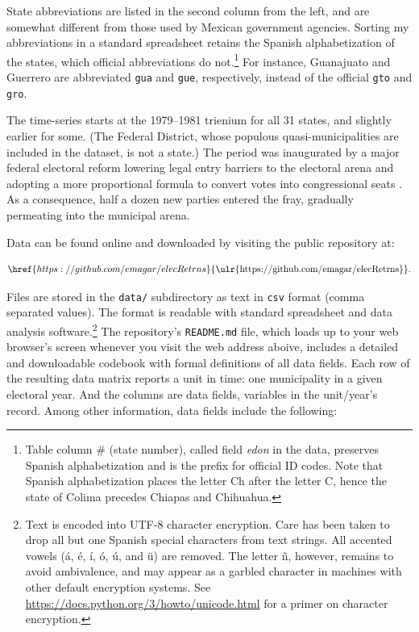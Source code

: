 \documentclass[letter,12pt]{article}
\begin{document}
State abbreviations are listed in the second column from the left, and are somewhat different from those used by Mexican government agencies. Sorting my abbreviations in a standard spreadsheet retains the Spanish alphabetization of the states, which official abbreviations do not.\footnote{Table column \# (state number), called field \emph{edon} in the data, preserves Spanish alphabetization and is the prefix for official ID codes. Note that Spanish alphabetization places the letter Ch after the letter C, hence the state of Colima precedes Chiapas and Chihuahua.} For instance, Guanajuato and Guerrero are abbreviated \verb|gua| and \verb|gue|, respectively, instead of the official \verb|gto| and \verb|gro|.

The time-series starts at the 1979--1981 trienium for all 31 states, and slightly earlier for some. (The Federal District, whose populous quasi-municipalities are included in the dataset, is not a state.) The period was inaugurated by a major federal electoral reform lowering legal entry barriers to the electoral arena and adopting a more proportional formula to convert votes into congressional seats \citep[:116]{molinar.1991a}. As a consequence, half a dozen new parties entered the fray, gradually permeating into the municipal arena.  

Data can be found online and downloaded by visiting the public repository at:

\begin{equation*}
\href{https://github.com/emagar/elecRetrns}{\text{\ulr{https://github.com/emagar/elecRetrns}}}.
\end{equation*}

\noindent Files are stored in the \verb|data/| subdirectory as text in \verb|csv| format (comma separated values). The format is readable with standard spreadsheet and data analysis software.\footnote{Text is encoded into UTF-8 character encryption. Care has been taken to drop all but one Spanish special characters from text strings. All accented vowels (\'a, \'e, \'i, \'o, \'u, and \"u) are removed. The letter \~n, however, remains to avoid ambivalence, and may appear as a garbled character in machines with other default encryption systems. See \url{https://docs.python.org/3/howto/unicode.html} for a primer on character encryption.} The repository's \verb|README.md| file, which loads up to your web browser's screen whenever you visit the web address aboive, includes a detailed and downloadable codebook with formal definitions of all data fields. Each row of the resulting data matrix reports a unit in time: one municipality in a given electoral year. And the columns are data fields, variables in the unit/year's record. Among other information, data fields include the following:
\end{document}
